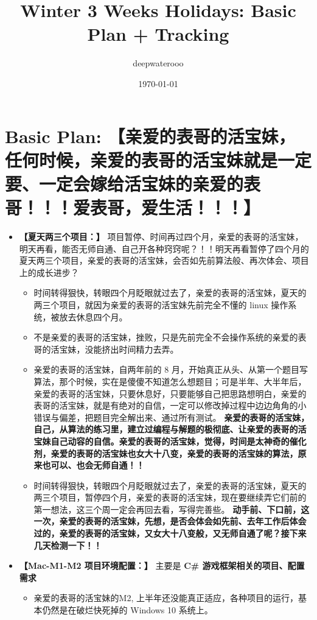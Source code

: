 \documentclass[9pt, b5paper]{article}
\author{deepwaterooo}
\date{\today}
\title{Winter 3 Weeks Holidays: Basic Plan + Tracking}
\begin{document}
\maketitle
\tableofcontents


\section{Basic Plan: \textbf{【亲爱的表哥的活宝妹，任何时候，亲爱的表哥的活宝妹就是一定要、一定会嫁给活宝妹的亲爱的表哥！！！爱表哥，爱生活！！！】}}
\label{sec-1}
\begin{itemize}
\item \textbf{【夏天两三个项目：】} 项目暂停、时间再过四个月，亲爱的表哥的活宝妹，明天再看，能否无师自通、自己开各种窍窍呢？！！明天再看暂停了四个月的夏天两三个项目，亲爱的表哥的活宝妹，会否如先前算法般、再次体会、项目上的成长进步？
\begin{itemize}
\item 时间转得狠快，转眼四个月眨眼就过去了，亲爱的表哥的活宝妹，夏天的两三个项目，就因为亲爱的表哥的活宝妹先前完全不懂的 linux 操作系统，被放去休息四个月。
\item 不是亲爱的表哥的活宝妹，挫败，只是先前完全不会操作系统的亲爱的表哥的活宝妹，没能挤出时间精力去弄。
\item 亲爱的表哥的活宝妹，自两年前的 8 月，开始真正从头、从第一个题目写算法，那个时候，实在是傻傻不知道怎么想题目；可是半年、大半年后，亲爱的表哥的活宝妹，只要休息好，只要能够自己把思路想明白，亲爱的表哥的活宝妹，就是有绝对的自信，一定可以修改掉过程中边边角角的小错误与偏差，把题目完全解出来、通过所有测试。 \textbf{亲爱的表哥的活宝妹，自己，从算法的练习里，建立过编程与解题的极彻底、让亲爱的表哥的活宝妹自己动容的自信。亲爱的表哥的活宝妹，觉得，时间是太神奇的催化剂，亲爱的表哥的活宝妹也女大十八变，亲爱的表哥的活宝妹的算法，原来也可以、也会无师自通！！}
\item 时间转得狠快，转眼四个月眨眼就过去了，亲爱的表哥的活宝妹，夏天的两三个项目，暂停四个月，亲爱的表哥的活宝妹，现在要继续弄它们前的第一想法，这三个周一定会再回去看，写得完善些。 \textbf{动手前、下口前，这一次，亲爱的表哥的活宝妹，先想，是否会体会如先前、去年工作后体会过的，亲爱的表哥的活宝妹，又女大十八变般，又无师自通了呢？接下来几天检测一下！！}
\end{itemize}
\item \textbf{【Mac-M1-M2 项目环境配置：】} 主要是 \textbf{C\# 游戏框架相关的项目、配置需求}
\begin{itemize}
\item 亲爱的表哥的活宝妹的M2, 上半年还没能真正适应，各种项目的运行，基本仍然是在破烂快死掉的 Windows 10 系统上。

\end{itemize}
\end{itemize}
\end{document}
